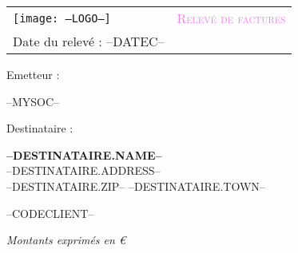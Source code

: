 \newcommand{\FOOT}{--FOOT--}

\newcommand{\specialcell}[2][c]{
	\parbox[#1]{3.8cm}{#2}}
	
\begin{tabular}{p{9cm} p{8cm}}
    \vspace{0pt} 
    \texttt{[image: --LOGO--]}
    & 
    \vspace{0pt}
   \raggedleft
	\textcolor{violet}{\textsc{\Large Relev\'e de factures}}\\
	Date du relev\'e : --DATEC--\\
\end{tabular}


\begin{minipage}[t]{0.40\textwidth}
{\small Emetteur :}\\
\begin{fminipage}
--MYSOC--
\end{fminipage}
\end{minipage}
\hspace{1cm}
\begin{minipage}[t]{0.52\textwidth}
{\small Destinataire :}

\begin{fminipage}
\textbf{\large --DESTINATAIRE.NAME--}\\
--DESTINATAIRE.ADDRESS--\\
\textsc{--DESTINATAIRE.ZIP-- --DESTINATAIRE.TOWN--}\\
\begin{minipage}{\textwidth}
\flushright
{\tiny --CODECLIENT--}
\end{minipage}
\end{fminipage}
\end{minipage}

\begin{minipage}[t]{\textwidth}
\begin{flushright}
{\footnotesize \textit{Montants exprimés en €}}
\end{flushright}
\end{minipage}

